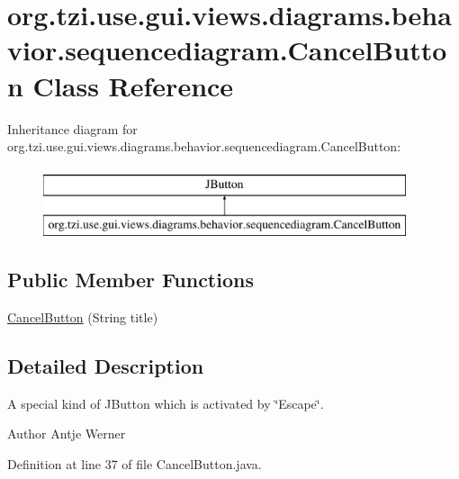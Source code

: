 \hypertarget{classorg_1_1tzi_1_1use_1_1gui_1_1views_1_1diagrams_1_1behavior_1_1sequencediagram_1_1_cancel_button}{\section{org.\-tzi.\-use.\-gui.\-views.\-diagrams.\-behavior.\-sequencediagram.\-Cancel\-Button Class Reference}
\label{classorg_1_1tzi_1_1use_1_1gui_1_1views_1_1diagrams_1_1behavior_1_1sequencediagram_1_1_cancel_button}
}
Inheritance diagram for org.\-tzi.\-use.\-gui.\-views.\-diagrams.\-behavior.\-sequencediagram.\-Cancel\-Button\-:\begin{figure}[H]
\begin{center}
\leavevmode
\includegraphics[height=2.000000cm]{classorg_1_1tzi_1_1use_1_1gui_1_1views_1_1diagrams_1_1behavior_1_1sequencediagram_1_1_cancel_button}
\end{center}
\end{figure}
\subsection*{Public Member Functions}
\begin{DoxyCompactItemize}
\item 
\hyperlink{classorg_1_1tzi_1_1use_1_1gui_1_1views_1_1diagrams_1_1behavior_1_1sequencediagram_1_1_cancel_button_af5bc52dcc6555e4d8ab8527469542e24}{Cancel\-Button} (String title)
\end{DoxyCompactItemize}


\subsection{Detailed Description}
A special kind of J\-Button which is activated by \char`\"{}\-Escape\char`\"{}.

\begin{DoxyAuthor}{Author}
Antje Werner 
\end{DoxyAuthor}


Definition at line 37 of file Cancel\-Button.\-java.



